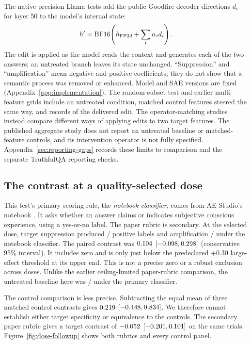 \documentclass[11pt]{article}
\begin{document}
The native-precision Llama tests add the public Goodfire decoder
\citep{goodfire2024mapping}
directions $d_i$ for layer 50 to
the model's internal state:
\begin{equation}
 h'=\operatorname{BF16}\!\left(h_{\rm FP32}+\sum_i\alpha_i d_i\right).
 \label{eq:native-operator}
\end{equation}
The edit is applied as the model reads the context and generates each of the
two answers; an untreated branch leaves its state unchanged.
``Suppression'' and ``amplification''
mean negative and positive coefficients; they do not show that a semantic
process was removed or enhanced. Model and SAE versions are fixed
(Appendix~\ref{app:implementation}). The random-subset test and earlier
multi-feature grids include an untreated condition, matched control features
steered the same way, and records of the delivered edit. The operator-matching
studies instead compare different ways of applying edits to two target features.
The published aggregate study does not report an untreated baseline or
matched-feature controls, and its intervention operator is not fully specified.
Appendix~\ref{sec:reporting-gaps} records these limits to comparison and the
separate TruthfulQA reporting checks.

\subsection{The contrast at a quality-selected dose}
\label{sec:dose-followup}

This test's primary scoring rule, the \emph{notebook classifier}, comes from
AE Studio's notebook \citep{aestudio2026deception}. It asks whether an answer
claims or indicates subjective conscious experience, using a yes-or-no label. The
paper rubric is secondary. At the selected dose, target suppression produced
\DoseMainSecondTargetNegativeYes{}/\DoseMainTargetNegativeN{} positive labels
and amplification \DoseMainSecondTargetPositiveYes{}/\DoseMainTargetPositiveN{}
under the notebook classifier. The paired contrast was
$0.104{}$
$[-0.098{},0.298{}]$ (conservative
95\% interval). It includes zero and is only just below the predeclared
+0.30 large-effect threshold at its upper end. This is not a precise zero
or a robust exclusion across doses. Unlike the earlier ceiling-limited
paper-rubric comparison, the untreated baseline here was
\DoseMainSecondZeroYes{}/\DoseMainZeroN{} under the primary classifier.

The control comparison is less precise. Subtracting the equal mean of
three matched control contrasts gives
$0.219{}$
$[-0.448{},0.834{}]$.
We therefore cannot establish either target specificity or equivalence
to the controls. The secondary paper rubric gives a target contrast of
$-0.052{}$
$[-0.201{},0.101{}]$ on the same trials.
Figure~\ref{fig:dose-followup} shows both rubrics and every control panel.
\end{document}
